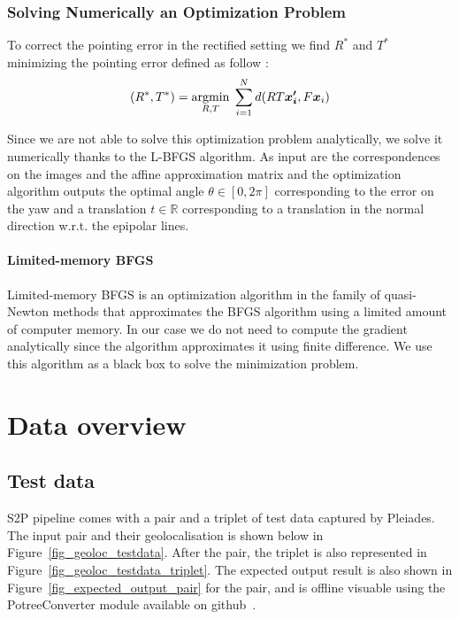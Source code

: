 \documentclass[paper=a4, fontsize=11pt, onecolumn, tikz, dvipsnames, svgnames, x11names]{article}
\begin{document}
\subsubsection{Solving Numerically an Optimization Problem}
To correct the pointing error in the rectified setting we find $R^*$ and $T^*$ minimizing the pointing error defined as follow :
\begin{align}
    (R^*, T^*) = \underset{R,T}{\operatorname{argmin}}\; \sum_{i=1}^N d(RT\bm{x_i'}, F\bm{x}_i)
\end{align}

Since we are not able to solve this optimization problem analytically, we solve it numerically thanks to the L-BFGS algorithm. As input are the correspondences on the images and the affine approximation matrix and the optimization algorithm outputs the optimal angle $\theta \in [0, 2\pi]$ corresponding to the error on the yaw and a translation $t \in \mathbb{R}$ corresponding to a translation in the normal direction w.r.t. the epipolar lines.

\paragraph*{Limited-memory BFGS\\}
Limited-memory BFGS is an optimization algorithm in the family of quasi-Newton methods that approximates the BFGS algorithm using a limited amount of computer memory. In our case we do not need to compute the gradient analytically since the algorithm approximates it using finite difference. We use this algorithm as a black box to solve the minimization problem.

\newpage
\section{Data overview}

\subsection{Test data}

S2P pipeline comes with a pair and a triplet of test data captured by Pleiades. The input pair and their geolocalisation is shown below in Figure~\ref{fig_geoloc_testdata}. After the pair, the triplet is also represented in Figure~\ref{fig_geoloc_testdata_triplet}. The expected output result is also shown in Figure~\ref{fig_expected_output_pair} for the pair, and is offline visuable using the PotreeConverter module available on github~\cite{PotreeConverter}.
\end{document}
